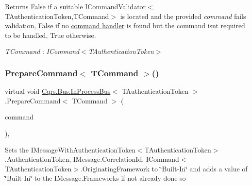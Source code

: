 \begin{DoxyReturn}{Returns}
False if a suitable I\+Command\+Validator$<$\+T\+Authentication\+Token,\+T\+Command$>$ is located and the provided {\itshape command}  fails validation, False if no \hyperlink{classCqrs_1_1Bus_1_1RouteHandlerDelegate}{command handler} is found but the command isn\textquotesingle{}t required to be handled, True otherwise. 
\end{DoxyReturn}
\begin{Desc}
\item[Type Constraints]\begin{description}
\item[{\em T\+Command} : {\em I\+Command$<$T\+Authentication\+Token$>$}]\end{description}
\end{Desc}
\mbox{\label{classCqrs_1_1Bus_1_1InProcessBus_ab0064808b1b619bee57fa5eff49bfca7_ab0064808b1b619bee57fa5eff49bfca7}} 
\subsubsection{\texorpdfstring{Prepare\+Command$<$ T\+Command $>$()}{PrepareCommand< TCommand >()}}
{\footnotesize\ttfamily virtual void \hyperlink{classCqrs_1_1Bus_1_1InProcessBus}{Cqrs.\+Bus.\+In\+Process\+Bus}$<$ T\+Authentication\+Token $>$.Prepare\+Command$<$ T\+Command $>$ (\begin{DoxyParamCaption}\item[{T\+Command}]{command }\end{DoxyParamCaption})\hspace{0.3cm}{\ttfamily [protected]}, {\ttfamily [virtual]}}



Sets the I\+Message\+With\+Authentication\+Token$<$\+T\+Authentication\+Token$>$.\+Authentication\+Token, I\+Message.\+Correlation\+Id, I\+Command$<$\+T\+Authentication\+Token$>$.\+Originating\+Framework to \char`\"{}\+Built-\/\+In\char`\"{} and adds a value of \char`\"{}\+Built-\/\+In\char`\"{} to the I\+Message.\+Frameworks if not already done so 

